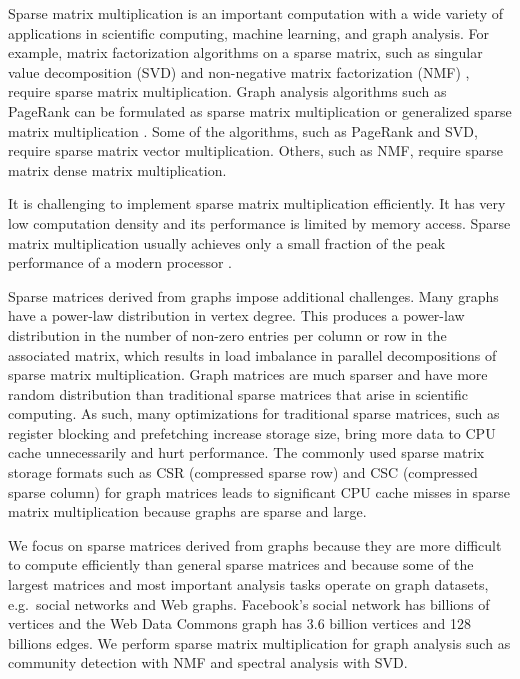 Sparse matrix multiplication is an important computation with a wide variety
of applications in scientific computing, machine learning, and graph analysis.
For example, matrix factorization algorithms on a sparse matrix, such as
singular value decomposition (SVD) \cite{svd} and non-negative matrix
factorization (NMF) \cite{nmf}, require sparse matrix multiplication.
Graph analysis algorithms such as PageRank \cite{pagerank} can be
formulated as sparse matrix multiplication or generalized sparse matrix
multiplication \cite{Mattson13}. Some of
the algorithms, such as PageRank and SVD, require sparse matrix vector
multiplication. Others, such as NMF, require sparse matrix dense
matrix multiplication.

It is challenging to implement sparse matrix multiplication efficiently.
It has very low computation density and its
performance is limited by memory access. Sparse matrix multiplication usually achieves only
a small fraction of the peak performance of a modern processor \cite{Williams07}.

Sparse matrices derived from graphs impose additional challenges.
Many graphs have a power-law distribution in vertex
degree.  This produces a power-law distribution in the number of non-zero
entries per column or row in the associated matrix, which
results in load imbalance in parallel decompositions of sparse
matrix multiplication.
Graph matrices are much sparser and have more random distribution
than traditional sparse matrices that arise in scientific
computing. As such, many optimizations for traditional sparse matrices, such
as register blocking and prefetching \cite{Williams07} increase storage size,
bring more data to CPU cache unnecessarily and hurt performance.
The commonly used sparse matrix storage formats such as CSR (compressed sparse
row) and CSC (compressed sparse column) for graph matrices leads to significant
CPU cache misses in sparse matrix multiplication because graphs are sparse and
large.

We focus on sparse matrices derived from graphs because they are more difficult
to compute efficiently than general sparse matrices and because some of the
largest matrices and most important analysis tasks operate on graph datasets,
e.g.~social networks and Web graphs.
Facebook's social network has billions of vertices and
the Web Data Commons graph \cite{web_graph} has 3.6 billion vertices and 128
billions edges. We perform sparse matrix multiplication for graph
analysis such as community detection with NMF and spectral analysis with SVD.

